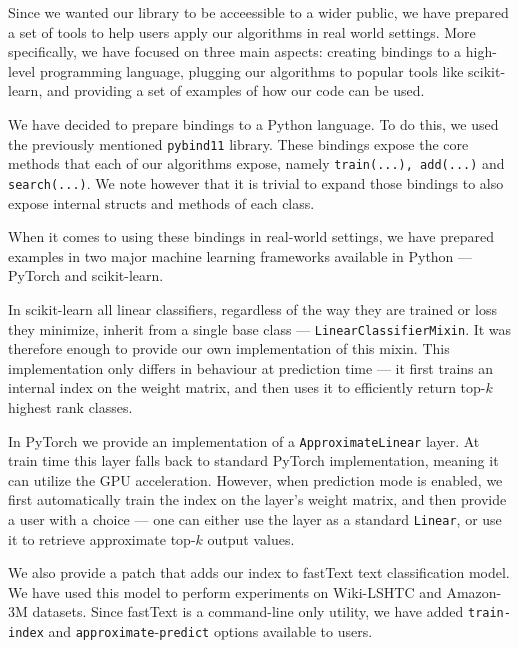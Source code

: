 Since we wanted our library to be acceessible to a wider public, we have prepared
a set of tools to help users apply our algorithms in real world settings. More specifically,
we have focused on three main aspects: creating bindings to a high-level programming language,
plugging our algorithms to popular tools like scikit-learn, and providing a set
of examples of how our code can be used.

We have decided to prepare bindings to a Python language. To do this, we used
the previously mentioned \texttt{pybind11} library. These bindings expose the core methods that
each of our algorithms expose, namely \texttt{train(...), add(...)} and \texttt{search(...)}.
We note however that it is trivial to expand those bindings to also expose internal
structs and methods of each class.

When it comes to using these bindings in real-world settings, we have prepared examples
in two major machine learning frameworks available in Python --- PyTorch
and scikit-learn.

In scikit-learn all linear classifiers, regardless of the way they are trained
or loss they minimize, inherit from a single base class --- \texttt{LinearClassifierMixin}.
It was therefore enough to provide our own implementation of this mixin. This implementation
only differs in behaviour at prediction time --- it first trains an internal index on the
weight matrix, and then uses it to efficiently return top-$k$ highest rank classes.

In PyTorch we provide an implementation of a \texttt{ApproximateLinear} layer.
At train time this layer falls back to standard PyTorch implementation, meaning
it can utilize the GPU acceleration. However, when prediction mode is enabled, we first
automatically train the index on the layer's weight matrix, and then provide a user with
a choice --- one can either use the layer as a standard \texttt{Linear}, or use it
to retrieve approximate top-$k$ output values.

We also provide a patch that adds our index to fastText text classification model.
We have used this model to perform experiments on Wiki-LSHTC and Amazon-3M datasets.
Since fastText is a command-line only utility, we have added \texttt{train-index}
and \texttt{approximate}-\texttt{predict} options available to users.
